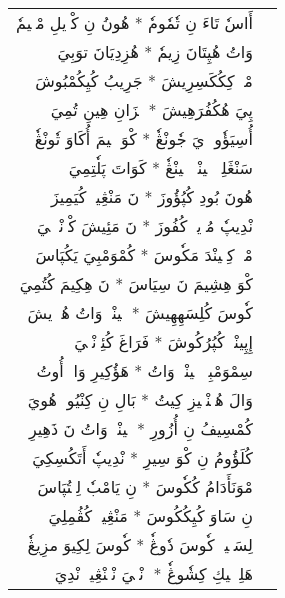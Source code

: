 \documentclass[a4paper, 12pt]{report}
\begin{document}
\begin{longtable}{rl}
\textarabic{أَاسٗ تَاءَ نِ تٗمٗومٗ  *  هُونُ نِ كْوٖيلِ مْسٖيمٗ} & \\ 
\textarabic{وَاتُ هُپِتَانَ زِيمٗ  *  هُزِدِيَانَ توَبِيَ} & \\ 
[8mm] 

\textarabic{مْكٖ كِكُكَسِرِيشَ  *  جَرِيبُ كُيِكُمْبُوشَ} & \\ 
\textarabic{پِيَ هُكُفُرَهِيشَ  *  مٖزَانِ هِينِ تُمِيَ} & \\ 
[8mm] 

\textarabic{أُسِيَؤٗونٖ يَ جٗونْڠٗ  *  كْوَ مٖيمَ أُكَاوَ تٗونْڠٗ} & \\ 
\textarabic{سَنْڠَلِيٖ پٖينْيٖ پٖينْڠٗ  *  كَوَاتَ پَلٗتِمِيَ} & \\ 
[8mm] 

\textarabic{هُونَ بُودِ كُپُؤُوزَ  *  نَ مَنْڠِينٖ كُيَمِيزَ} & \\ 
\textarabic{نْدِيپٗ مُوٖيزٖ كُفُوزَ  *  نَ مَئِيشَ كْوٖنْدٖلٖيَ} & \\ 
[8mm] 

\textarabic{مْكٖ كِتٖينْدَ مَكٗوسَ  *  كُمْوَمْبِيَ يَكُپَاسَ} & \\ 
\textarabic{كْوَ هِشِيمَ نَ سِيَاسَ  *  نَ هِكِيمَ كُتُمِيَ} & \\ 
[8mm] 

\textarabic{كٗوسَ كُلِسَهِهِيشَ  *  پٖينْيٖ وَاتُ هُجٖرٖيشَ} & \\ 
\textarabic{إِپِينْدٖ كُپُرُكُوشَ  *  فَرَاغَ كُئِزٖنْڠٖيَ} & \\ 
[8mm] 

\textarabic{سِمْوَمْبِيٖ پٖينْيٖ وَاتُ  *  هَؤُكِيرِ وَاكٖ أُوتُ} & \\ 
\textarabic{وَالَ هُتٖنْڠٖيزِ كِيتُ  *  بَالِ نِ كِنْيُومٖ هُويَ} & \\ 
[8mm] 

\textarabic{كُمْسِيفُ نِ أُزُورِ  *  پٖينْيٖ وَاتُ نَ ذَهِيرِ} & \\ 
\textarabic{كُلَؤُومُ نِ كْوَ سِيرِ  *  نْدِيپٗ أَتَكُسِكِيَ} & \\ 
[8mm] 

\textarabic{مْوَنَأَدَامُ كُكٗوسَ  *  نِ يَامْبٗ لِمٖتُپَاسَ} & \\ 
\textarabic{نِ سَاوَ كُيِكُكُوسَ  *  مَنْڠِينٖ كُڤُمِلِيَ} & \\ 
[8mm] 

\textarabic{لِسَمٖيهٖ كٗوسَ دٗوڠٗ  *  كٗوسَ لِكِيوَ مزِيڠٗ} & \\ 
\textarabic{هَلِپٖلٖيكِ كِشٗوڠٗ  *  زٖنْڠٖيَ نْيٖنْڠِينٖ نْدِيَ} & \\ 
[8mm] 


\end{longtable}
\end{document}
